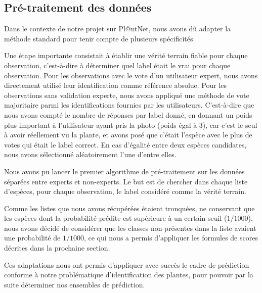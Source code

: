 \documentclass[a4paper,12pt]{article}
\begin{document}

\subsection{Pré-traitement des données}

Dans le contexte de notre projet sur Pl@ntNet, nous avons dû adapter la méthode standard pour tenir compte de plusieurs spécificités. 

\vspace{0.2cm}

Une étape importante consistait à établir une vérité terrain fiable pour chaque observation, c'est-à-dire à déterminer quel label était le vrai pour chaque observation. Pour les observations avec le vote d'un utilisateur expert, nous avons directement utilisé leur identification comme référence absolue. Pour les observations sans validation experte, nous avons appliqué une méthode de vote majoritaire parmi les identifications fournies par les utilisateurs. C'est-à-dire que nous avons compté le nombre de réponses par label donné, en donnant un poids plus important à l'utilisateur ayant pris la photo (poids égal à $3$), car c'est le seul à avoir réellement vu la plante, et avons posé que c'était l'espèce avec le plus de votes qui était le label correct. En cas d'égalité entre deux espèces candidates, nous avons sélectionné aléatoirement l'une d'entre elles.

\vspace{0.2cm}

Nous avons pu lancer le premier algorithme de pré-traitement sur les données séparées entre experts et non-experts. Le but est de chercher dans chaque liste d'espèces, pour chaque observation, le label considéré comme la vérité terrain.

\vspace{0.2cm}

Comme les listes que nous avons récupérées étaient tronquées, ne conservant que les espèces dont la probabilité prédite est supérieure à un certain seuil ($1/1000$), nous avons décidé de considérer que les classes non présentes dans la liste avaient une probabilité de $1/1000$, ce qui nous a permis d'appliquer les formules de scores décrites dans la prochaine section.

\vspace{0.2cm}

Ces adaptations nous ont permis d'appliquer avec succès le cadre de prédiction conforme à notre problématique d'identification des plantes, pour pouvoir par la suite déterminer nos ensembles de prédiction.
\end{document}
